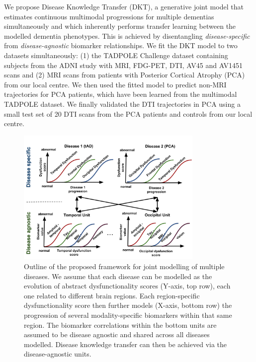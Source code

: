 \documentclass{llncs}
\begin{document}
We propose Disease Knowledge Transfer (DKT), a generative joint model that estimates continuous multimodal progressions for multiple dementias simultaneously and which inherently performs transfer learning between the modelled dementia phenotypes. This is achieved by disentangling \emph{disease-specific} from \emph{disease-agnostic} biomarker relationships. We fit the DKT model to two datasets simultaneously: (1) the TADPOLE Challenge dataset containing subjects from the ADNI study with MRI, FDG-PET, DTI, AV45 and AV1451 scans and (2) MRI scans from patients with Posterior Cortical Atrophy (PCA) from our local centre. We then used the fitted model to predict non-MRI trajectories for PCA patients, which have been learned from the multimodal TADPOLE dataset. We finally validated the DTI trajectories in PCA using a small test set of 20 DTI scans from the PCA patients and controls from our local centre.

% 
% 
% 
%


\begin{figure}[h]
 \centering
 \includegraphics[width=0.8\textwidth,trim=0 0 0 80,clip]{figures/disease_knowledge_transfer.png}
 \caption{Outline of the proposed framework for joint modelling of multiple diseases. We assume that each disease can be modelled as the evolution of abstract dysfunctionality scores (Y-axis, top row), each one related to different brain regions. Each region-specific dysfunctionality score then further models (X-axis, bottom row) the progression of several modality-specific biomarkers within that same region. The biomarker correlations within the bottom units are assumed to be disease agnostic and shared across all diseases modelled. Disease knowledge transfer can then be achieved via the disease-agnostic units.}
 \label{fig:diagram}
\end{figure}
\end{document}
